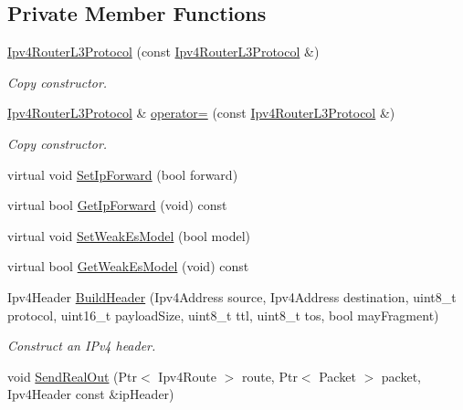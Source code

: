 \subsection*{Private Member Functions}
\begin{DoxyCompactItemize}
\item 
\hyperlink{classns3_1_1Ipv4RouterL3Protocol_a018ab17a0a3160669b90ee6171c86aca}{Ipv4\-Router\-L3\-Protocol} (const \hyperlink{classns3_1_1Ipv4RouterL3Protocol}{Ipv4\-Router\-L3\-Protocol} \&)
\begin{DoxyCompactList}\small\item\em Copy constructor. \end{DoxyCompactList}\item 
\hyperlink{classns3_1_1Ipv4RouterL3Protocol}{Ipv4\-Router\-L3\-Protocol} \& \hyperlink{classns3_1_1Ipv4RouterL3Protocol_aa40baa411eeb3351bc5a2b5e0e1e9a5f}{operator=} (const \hyperlink{classns3_1_1Ipv4RouterL3Protocol}{Ipv4\-Router\-L3\-Protocol} \&)
\begin{DoxyCompactList}\small\item\em Copy constructor. \end{DoxyCompactList}\item 
virtual void \hyperlink{classns3_1_1Ipv4RouterL3Protocol_afea7958043ce0d38eb31f4440ea77abf}{Set\-Ip\-Forward} (bool forward)
\item 
virtual bool \hyperlink{classns3_1_1Ipv4RouterL3Protocol_a9402a1e20d4654777690f3325160045f}{Get\-Ip\-Forward} (void) const 
\item 
virtual void \hyperlink{classns3_1_1Ipv4RouterL3Protocol_a5d0537c163f0a6f04c2f0c5601075d2d}{Set\-Weak\-Es\-Model} (bool model)
\item 
virtual bool \hyperlink{classns3_1_1Ipv4RouterL3Protocol_a8023a88747b29737972a1d803daf9dcb}{Get\-Weak\-Es\-Model} (void) const 
\item 
Ipv4\-Header \hyperlink{classns3_1_1Ipv4RouterL3Protocol_a45fa0dd63568af0c2d0c4a7142072631}{Build\-Header} (Ipv4\-Address source, Ipv4\-Address destination, uint8\-\_\-t protocol, uint16\-\_\-t payload\-Size, uint8\-\_\-t ttl, uint8\-\_\-t tos, bool may\-Fragment)
\begin{DoxyCompactList}\small\item\em Construct an I\-Pv4 header. \end{DoxyCompactList}\item 
void \hyperlink{classns3_1_1Ipv4RouterL3Protocol_a35646708634f0d7008322bb34a4dc799}{Send\-Real\-Out} (Ptr$<$ Ipv4\-Route $>$ route, Ptr$<$ Packet $>$ packet, Ipv4\-Header const \&ip\-Header)

\end{DoxyCompactItemize}
